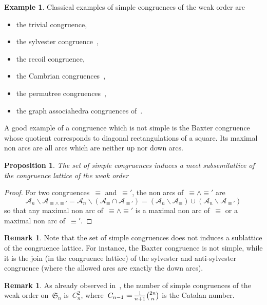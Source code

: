 \documentclass{amsart}
\newtheorem{proposition}[theorem]{Proposition}
\theoremstyle{definition}
\newtheorem{example}[theorem]{Example}
\newtheorem{remark}[theorem]{Remark}
\newcommand{\f}[1]{{\mathfrak{#1}}} %
\newcommand{\ssm}{\smallsetminus} %
\newcommand{\eqdef}{\mbox{\,\raisebox{0.2ex}{\scriptsize\ensuremath{\mathrm:}}\ensuremath{=}\,}} %
\newcommand{\arcs}{{\mathcal{A}}} %
\newcommand{\meet}{\wedge} %
\begin{document}
\begin{example}
Classical examples of simple congruences of the weak order are
\begin{itemize}
\item the trivial congruence,
\item the sylvester congruence~\cite{Tonks, HivertNovelliThibon-algebraBinarySearchTrees},
\item the recoil congruence,
\item the Cambrian congruences~\cite{Reading-CambrianLattices, ChatelPilaud},
\item the permutree congruences~\cite{PilaudPons-permutrees},
\item the graph associahedra congruences of~\cite{BarnardMcConville}.
\end{itemize}
A good example of a congruence which is not simple is the Baxter congruence~\cite{LawReading, Giraudo} whose quotient corresponds to diagonal rectangulations of a square. Its maximal non arcs are all arcs which are neither up nor down arcs.
\end{example}

\begin{proposition}
\label{prop:simpleCongruenceMeetSemilattice}
The set of simple congruences induces a meet subsemilattice of the congruence lattice of the weak order
\end{proposition}

\begin{proof}
For two congruences~$\equiv$ and~$\equiv'$, the non arcs of~${\equiv} \meet {\equiv'}$ are
\[
\arcs_n \ssm \arcs_{{\equiv} \meet {\equiv'}} = \arcs_n \ssm (\arcs_{\equiv} \cap \arcs_{\equiv'}) = (\arcs_n \ssm \arcs_{\equiv}) \cup (\arcs_n \ssm \arcs_{\equiv'})
\]
so that any maximal non arc of~${\equiv} \meet {\equiv'}$ is a maximal non arc of~${\equiv}$ or a maximal non arc of~${\equiv'}$.
\end{proof}

\begin{remark}
Note that the set of simple congruences does not induces a sublattice of the congruence lattice.
For instance, the Baxter congruence is not simple, while it is the join (in the congruence lattice) of the sylvester and anti-sylvester congruence (where the allowed arcs are exactly the down arcs).
\end{remark}

\begin{remark}
As already observed in~\cite[Sect.~4.4]{HoangMutze}, the number of simple congruences of the weak order on~$\f{S}_n$ is~$C_n^2$, where~$C_{n-1} \eqdef \frac{1}{n+1} \binom{2n}{n}$ is the Catalan number.
\end{remark}
\end{document}
